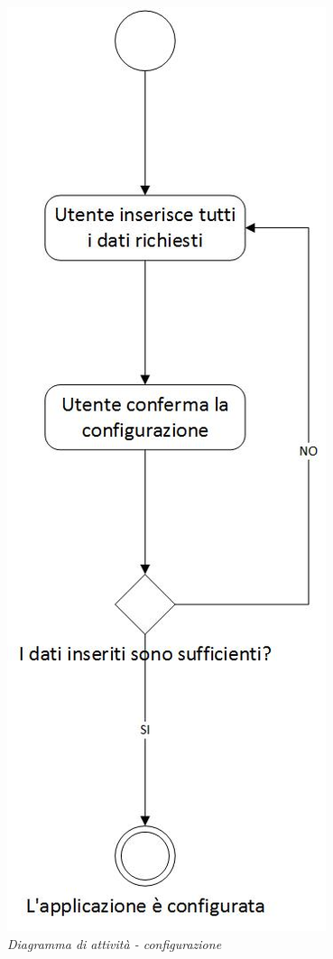 	\begin{figure}[ht]
		\centering
		\includegraphics[scale=0.35]{immagini/analisi/002_configurazione.jpg}
		\caption{\textit{Diagramma di attività - configurazione}}
	\end{figure}\FloatBarrier
	
